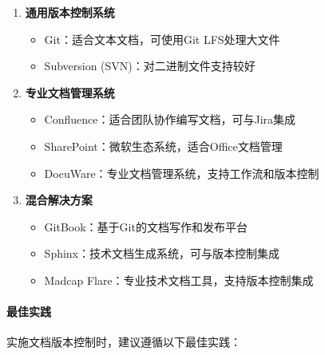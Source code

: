 \begin{enumerate}
\def\labelenumi{\arabic{enumi}.}
\tightlist
\item
  \textbf{通用版本控制系统}

  \begin{itemize}
  \tightlist
  \item
    Git：适合文本文档，可使用Git LFS处理大文件
  \item
    Subversion (SVN)：对二进制文件支持较好
  \end{itemize}
\item
  \textbf{专业文档管理系统}

  \begin{itemize}
  \tightlist
  \item
    Confluence：适合团队协作编写文档，可与Jira集成
  \item
    SharePoint：微软生态系统，适合Office文档管理
  \item
    DocuWare：专业文档管理系统，支持工作流和版本控制
  \end{itemize}
\item
  \textbf{混合解决方案}

  \begin{itemize}
  \tightlist
  \item
    GitBook：基于Git的文档写作和发布平台
  \item
    Sphinx：技术文档生成系统，可与版本控制集成
  \item
    Madcap Flare：专业技术文档工具，支持版本控制集成
  \end{itemize}
\end{enumerate}

\paragraph{最佳实践}\label{ux6700ux4f73ux5b9eux8df5}

实施文档版本控制时，建议遵循以下最佳实践：


